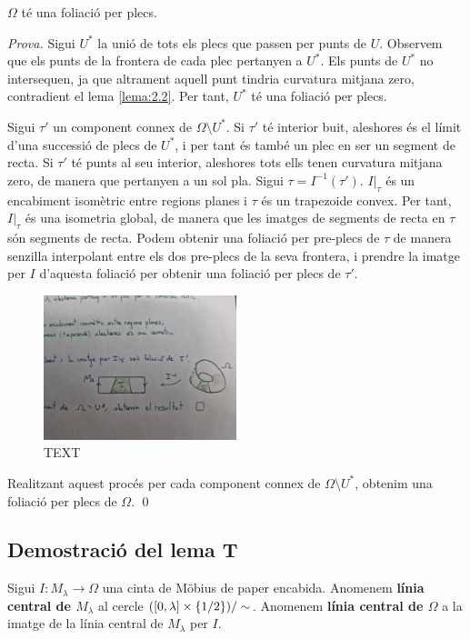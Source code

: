 \begin{teo}\label{teo:existencia_foliacio_plecs}
    $\Omega$ té una foliació per plecs.
\end{teo}
{
    \color{green!50!black}
    \textit{Prova.}
    Sigui $U^*$ la unió de tots els plecs que passen per punts de $U$. Observem que els punts de la frontera de cada plec pertanyen a $U^*$. Els punts de $U^*$ no intersequen, ja que altrament aquell punt tindria curvatura mitjana zero, contradient el lema \ref{lema:2.2}. Per tant, $U^*$ té una foliació per plecs. 

    Sigui $\tau'$ un component connex de $\Omega\setminus U^*$.
    Si $\tau'$ té interior buit, aleshores és el límit d'una successió de plecs de $U^*$, i per tant és també un plec en ser un segment de recta.
    Si $\tau'$ té punts al seu interior, aleshores tots ells tenen curvatura mitjana zero, de manera que pertanyen a un sol pla.
    Sigui $\tau = I^{-1}(\tau')$. $I|_{\tau}$ és un encabiment isomètric entre regions planes i $\tau$ és un trapezoide convex. Per tant, $I|_{\tau}$ és una isometria global, de manera que les imatges de segments de recta en $\tau$ són segments de recta. Podem obtenir una foliació per pre-plecs de $\tau$ de manera senzilla interpolant entre els dos pre-plecs de la seva frontera, i prendre la imatge per $I$ d'aquesta foliació per obtenir una foliació per plecs de $\tau'$.
    
    \begin{figure}[htbp]
        \centering
        \includegraphics[width=0.5\textwidth]{Fotos/TERCERA.jpg}
        \caption{{\color{blue}TEXT}}
        \label{fig:foliacio_plecs}
    \end{figure}

    Realitzant aquest procés per cada component connex de $\Omega\setminus U^*$, obtenim una foliació per plecs de $\Omega$.
    \qed
}
\subsection{Demostració del lema T}
\begin{defi}
    Sigui $I:M_\lambda\to\Omega$ una cinta de Möbius de paper encabida. 
    Anomenem \textbf{línia central de $M_\lambda$} al cercle $([0,\lambda]\times\{1/2\})/\sim$.
    Anomenem \textbf{línia central de $\Omega$} a la imatge de la línia central de $M_\lambda$ per $I$.
\end{defi}

